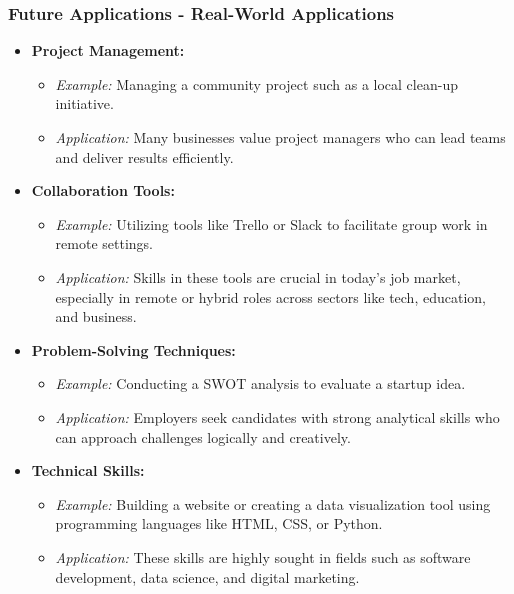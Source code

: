 \documentclass[aspectratio=169]{beamer}
\begin{document}
\begin{frame}[fragile]
  \frametitle{Future Applications - Real-World Applications}
  \begin{itemize}
    \item \textbf{Project Management:} 
      \begin{itemize}
        \item \textit{Example:} Managing a community project such as a local clean-up initiative.
        \item \textit{Application:} Many businesses value project managers who can lead teams and deliver results efficiently.
      \end{itemize}

    \item \textbf{Collaboration Tools:}
      \begin{itemize}
        \item \textit{Example:} Utilizing tools like Trello or Slack to facilitate group work in remote settings.
        \item \textit{Application:} Skills in these tools are crucial in today's job market, especially in remote or hybrid roles across sectors like tech, education, and business.
      \end{itemize}

    \item \textbf{Problem-Solving Techniques:}
      \begin{itemize}
        \item \textit{Example:} Conducting a SWOT analysis to evaluate a startup idea.
        \item \textit{Application:} Employers seek candidates with strong analytical skills who can approach challenges logically and creatively.
      \end{itemize}

    \item \textbf{Technical Skills:}
      \begin{itemize}
        \item \textit{Example:} Building a website or creating a data visualization tool using programming languages like HTML, CSS, or Python.
        \item \textit{Application:} These skills are highly sought in fields such as software development, data science, and digital marketing.
      \end{itemize}
  \end{itemize}
\end{frame}
\end{document}
